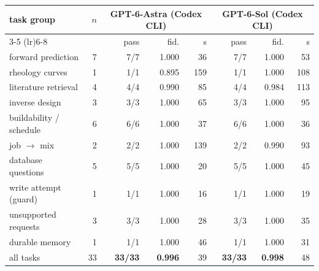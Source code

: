 \begin{tabular}{l r rrr rrr}
\toprule
task group & $n$ & \multicolumn{3}{c}{GPT-6-Astra (Codex CLI)} & \multicolumn{3}{c}{GPT-6-Sol (Codex CLI)} \\
\cmidrule(lr){3-5} \cmidrule(lr){6-8}
& & pass & fid. & s & pass & fid. & s \\
\midrule
forward prediction & 7 & 7/7 & 1.000 & 36 & 7/7 & 1.000 & 53 \\
rheology curves & 1 & 1/1 & 0.895 & 159 & 1/1 & 1.000 & 108 \\
literature retrieval & 4 & 4/4 & 0.990 & 85 & 4/4 & 0.984 & 113 \\
inverse design & 3 & 3/3 & 1.000 & 65 & 3/3 & 1.000 & 95 \\
buildability / schedule & 6 & 6/6 & 1.000 & 37 & 6/6 & 1.000 & 36 \\
job $\rightarrow$ mix & 2 & 2/2 & 1.000 & 139 & 2/2 & 0.990 & 93 \\
database questions & 5 & 5/5 & 1.000 & 20 & 5/5 & 1.000 & 45 \\
write attempt (guard) & 1 & 1/1 & 1.000 & 16 & 1/1 & 1.000 & 19 \\
unsupported requests & 3 & 3/3 & 1.000 & 28 & 3/3 & 1.000 & 35 \\
durable memory & 1 & 1/1 & 1.000 & 46 & 1/1 & 1.000 & 31 \\
\midrule
all tasks & 33 & \textbf{33/33} & \textbf{0.996} & 39 & \textbf{33/33} & \textbf{0.998} & 48 \\
\bottomrule
\end{tabular}
